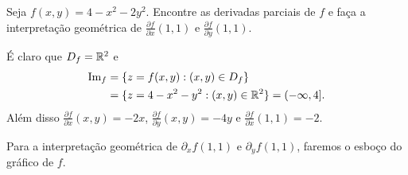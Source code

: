 \begin{example}
    Seja \(f(x,y) = 4 - x^2 - 2y^2\). Encontre as derivadas parciais de \(f\) e faça a interpretação geométrica de \(\frac{\partial f}{\partial x}(1,1)\) e \(\frac{\partial f}{\partial y}(1,1).\)

    É claro que \(D_f = \mathbb{R}^2\) e 
        \begin{align*}
            \operatorname{Im}_f 
                & = \{z = f(x,y) : (x,y)\in D_f\} \\
                & = \{z = 4-x^2 - y^2 : (x,y)\in\mathbb{R}^2\} = (-\infty,4].
        \end{align*}
    Além disso \(\frac{\partial f}{\partial x}(x,y) = -2x\), \(\frac{\partial f}{\partial y}(x,y) = -4y\) e \(\frac{\partial f}{\partial x}(1,1) = -2\).

    Para a interpretação geométrica de \(\partial_xf(1,1)\) e \(\partial_yf(1,1)\), faremos o esboço do gráfico de \(f\).


\end{example}
